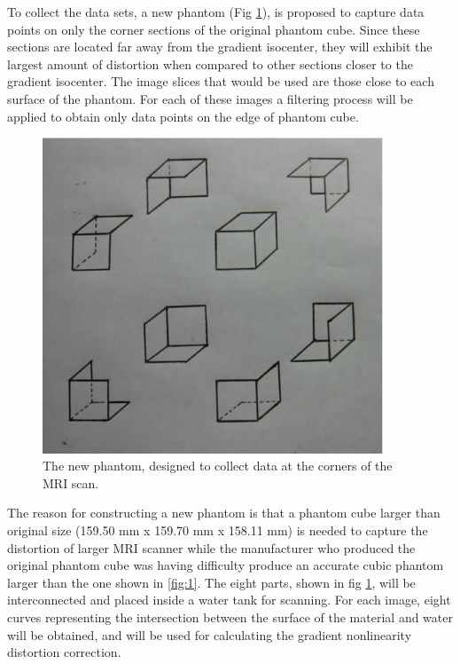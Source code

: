 \documentclass{sbthesis}
\begin{document}
To collect the data sets, a new phantom (Fig \ref{fig:2}), is proposed to capture data points on only the corner sections
of the original phantom cube.  Since these sections are located far away from the gradient isocenter, they will exhibit the largest amount
of distortion when compared to other sections closer to the gradient isocenter. The image slices that
would be used are those close to each surface of the phantom. For each of these images a 
filtering process will be applied to obtain only data points on the edge of phantom cube. 

\begin{figure}[htb]
  \begin{minipage}{0.80\linewidth}
    \centering
    \centerline{\mbox{\includegraphics[width=4in]{images/model2.eps}}}
    \centerline{}\medskip
  \end{minipage}
  \caption{The new phantom, designed to collect data at the corners of the MRI scan.}  \label{fig:2}
\end{figure}

The reason for constructing a new phantom is that a phantom cube larger than original size (159.50 mm x 159.70 mm x 158.11 mm) is needed to 
capture the distortion of larger MRI scanner while the manufacturer who produced the original
phantom cube was having difficulty produce an accurate cubic phantom larger than the
one shown in \ref{fig:1}. The eight parts, shown in fig \ref{fig:2}, will be interconnected and placed inside a water tank for scanning.
For each image, eight curves representing the intersection between the surface of the material
and water will be obtained, and will be used for calculating the gradient nonlinearity distortion correction.
\end{document}

